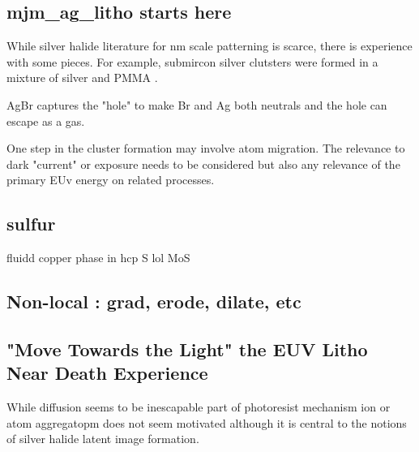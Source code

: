 
\subsection{mjm\_ag\_litho starts here }

While silver halide literature for nm scale patterning is scarce,
there is experience with some pieces. For example, submircon silver
clutsters were formed in a mixture of silver and PMMA
\cite{PMC4820741}.


AgBr captures the "hole" to make Br and Ag both neutrals and the
hole can escape as a gas. 

One step in the cluster formation may involve atom migration.
The relevance to dark "current" or exposure needs to be considered
but also any relevance of the primary EUv energy on related
processes. 


\subsection{sulfur}

fluidd copper phase in hcp S lol 
MoS

\subsection{Non-local : grad, erode, dilate, etc }


\subsection{"Move Towards the Light" the EUV Litho Near Death Experience}

While diffusion seems to be inescapable part of photoresist mechanism
ion or atom aggregatopm does not seem motivated although it
is central to the notions of silver halide latent image formation.






